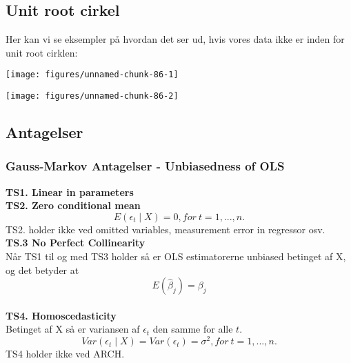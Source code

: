 \documentclass[
  10pt,
]{article}
\begin{document}
\newpage

\hypertarget{unit-root-cirkel}{%
\subsection{Unit root cirkel}\label{unit-root-cirkel}}

Her kan vi se eksempler på hvordan det ser ud, hvis vores data ikke er
inden for unit root cirklen:

\begin{center}\texttt{[image: figures/unnamed-chunk-86-1]} \end{center}

\begin{center}\texttt{[image: figures/unnamed-chunk-86-2]} \end{center}

\newpage

\hypertarget{antagelser}{%
\subsection{Antagelser}\label{antagelser}}

\hypertarget{gauss-markov-antagelser---unbiasedness-of-ols}{%
\subsubsection{Gauss-Markov Antagelser - Unbiasedness of
OLS}\label{gauss-markov-antagelser---unbiasedness-of-ols}}

\textbf{TS1. Linear in parameters }\\

\textbf{TS2. Zero conditional mean }\\
\[E(\epsilon_t\mid X) = 0, for\ t=1, ... ,n. \] TS2. holder ikke ved
omitted variables, measurement error in regressor osv.\\

\textbf{TS.3 No Perfect Collinearity }\\
Når TS1 til og med TS3 holder så er OLS estimatorerne unbiased betinget
af X, og det betyder at \[E(\hat{\beta}_j) = \beta_j \]\\

\textbf{TS4. Homoscedasticity }\\
Betinget af X så er variansen af \(\epsilon_t\) den samme for alle
\(t\).
\[Var(\epsilon_t\mid X) = Var(\epsilon_t) = \sigma^2, for\ t = 1, ... , n.  \]
TS4 holder ikke ved ARCH.\\
\end{document}
